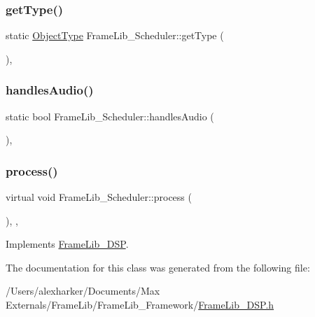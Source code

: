 \subsubsection{\texorpdfstring{get\+Type()}{getType()}}
{\footnotesize\ttfamily static \hyperlink{_frame_lib___types_8h_a842c5e2e69277690b064bf363c017980}{Object\+Type} Frame\+Lib\+\_\+\+Scheduler\+::get\+Type (\begin{DoxyParamCaption}{ }\end{DoxyParamCaption})\hspace{0.3cm}{\ttfamily [inline]}, {\ttfamily [static]}}

\mbox{\label{class_frame_lib___scheduler_a6ab661f5a92b9cc0096af2cde6c6f513}} 
\subsubsection{\texorpdfstring{handles\+Audio()}{handlesAudio()}}
{\footnotesize\ttfamily static bool Frame\+Lib\+\_\+\+Scheduler\+::handles\+Audio (\begin{DoxyParamCaption}{ }\end{DoxyParamCaption})\hspace{0.3cm}{\ttfamily [inline]}, {\ttfamily [static]}}

\mbox{\label{class_frame_lib___scheduler_aa5c10907d7d11e1beef86d19b8e93601}} 
\subsubsection{\texorpdfstring{process()}{process()}}
{\footnotesize\ttfamily virtual void Frame\+Lib\+\_\+\+Scheduler\+::process (\begin{DoxyParamCaption}{ }\end{DoxyParamCaption})\hspace{0.3cm}{\ttfamily [inline]}, {\ttfamily [protected]}, {\ttfamily [virtual]}}



Implements \hyperlink{class_frame_lib___d_s_p}{Frame\+Lib\+\_\+\+D\+SP}.



The documentation for this class was generated from the following file\+:\begin{DoxyCompactItemize}
\item 
/\+Users/alexharker/\+Documents/\+Max Externals/\+Frame\+Lib/\+Frame\+Lib\+\_\+\+Framework/\hyperlink{_frame_lib___d_s_p_8h}{Frame\+Lib\+\_\+\+D\+S\+P.\+h}\end{DoxyCompactItemize}
